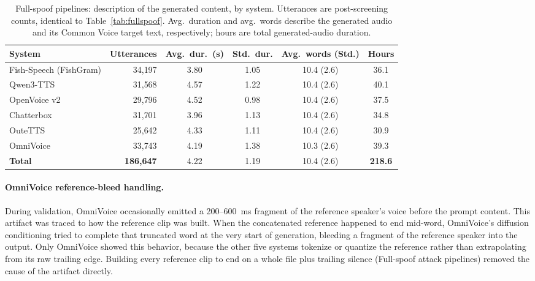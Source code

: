 \documentclass[11pt]{article}
\begin{document}
\begin{table}[t]
\centering
\caption{Full-spoof pipelines: description of the generated content, by
system. Utterances are post-screening counts, identical to
Table~\ref{tab:fullspoof}. Avg.\ duration and avg.\ words describe the
generated audio and its Common Voice target text, respectively; hours
are total generated-audio duration.}
\label{tab:fullspoofdesc}
\small
\begin{tabular}{lrcccc}
\toprule
\textbf{System} & \textbf{Utterances} & \textbf{Avg.\ dur.\ (s)} & \textbf{Std.\ dur.} & \textbf{Avg.\ words (Std.)} & \textbf{Hours} \\
\midrule
Fish-Speech (FishGram) & 34{,}197 & 3.80 & 1.05 & 10.4 (2.6) & 36.1 \\
Qwen3-TTS              & 31{,}568 & 4.57 & 1.22 & 10.4 (2.6) & 40.1 \\
OpenVoice v2           & 29{,}796 & 4.52 & 0.98 & 10.4 (2.6) & 37.5 \\
Chatterbox             & 31{,}701 & 3.96 & 1.13 & 10.4 (2.6) & 34.8 \\
OuteTTS                & 25{,}642 & 4.33 & 1.11 & 10.4 (2.6) & 30.9 \\
OmniVoice              & 33{,}743 & 4.19 & 1.38 & 10.3 (2.6) & 39.3 \\
\midrule
\textbf{Total}         & \textbf{186{,}647} & 4.22 & 1.19 & 10.4 (2.6) & \textbf{218.6} \\
\bottomrule
\end{tabular}
\end{table}

\paragraph{OmniVoice reference-bleed handling.} During validation,
OmniVoice occasionally emitted a 200--\SI{600}{\milli\second} fragment of
the reference speaker's voice before the prompt content. This artifact
was traced to how the reference clip was built. When the concatenated
reference happened to end mid-word, OmniVoice's diffusion conditioning
tried to complete that truncated word at the very start of generation,
bleeding a fragment of the reference speaker into the output. Only
OmniVoice showed this behavior, because the other five systems tokenize
or quantize the reference rather than extrapolating from its raw
trailing edge. Building every reference clip to end on a whole file plus
trailing silence (Full-spoof attack pipelines) removed the cause of the
artifact directly.
\end{document}
